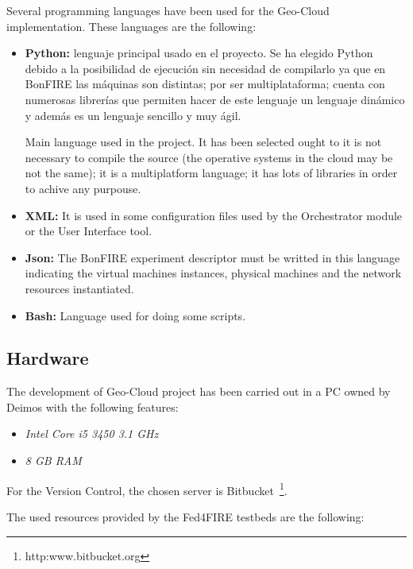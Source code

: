 Several programming languages have been used for the Geo-Cloud
implementation. These languages are the following:

\begin{itemize}
\item \textbf{Python:} lenguaje principal usado en el proyecto. Se ha elegido
  Python debido a la posibilidad de ejecución sin necesidad de compilarlo ya que
  en BonFIRE las máquinas son distintas; por ser multiplataforma; cuenta con
  numerosas librerías que permiten hacer de este lenguaje un lenguaje dinámico y
  además es un lenguaje sencillo y muy ágil.

  Main language used in the project. It has been selected ought to it is not
  necessary to compile the source (the operative systems in the cloud may be not
  the same); it is a multiplatform language; it has lots of libraries in order
  to achive any purpouse.
 \item \textbf{XML:} It is used in some configuration files used by the
   Orchestrator module or the User Interface tool.

\item \textbf{Json:} The BonFIRE experiment descriptor must be writted in this
  language indicating the virtual machines instances, physical machines and the
  network resources instantiated.

\item \textbf{Bash:} Language used for doing some scripts. 

\end{itemize}


\subsection{Hardware}

The development of Geo-Cloud project has been carried out in a PC owned by
Deimos with the following features:
\begin{itemize}
\item \emph{Intel Core i5 3450 3.1 GHz}
\item \emph{8 GB RAM}
\end{itemize}

For the Version Control, the chosen server is
Bitbucket~\footnote{http:www.bitbucket.org}.

The used resources provided  by the Fed4FIRE testbeds are the following:

